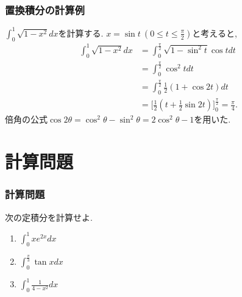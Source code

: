 \begin{frame}
\frametitle{置換積分の計算例}

$\int_0^1 \sqrt{1-x^2}dx$を計算する. 
$x=\sin t \ (0 \le t \le \frac{\pi}{2})$と考えると, 
\begin{align*}
\int_0^1 \sqrt{1-x^2}dx & = \int_0^\frac{\pi}{2} \sqrt{1-\sin^2 t} \cos t dt \\
& =  \int_0^\frac{\pi}{2} \cos^2 t dt \\
& =   \int_0^\frac{\pi}{2} \frac{1}{2}(1+\cos 2t)dt \\
& = \Big[\frac{1}{2}(t+\frac{1}{2} \sin 2t) \Big]_0^\frac{\pi}{2}=\frac{\pi}{4}. 
\end{align*}
倍角の公式$\cos 2 \theta = \cos^2 \theta-\sin^2 \theta=2 \cos^2 \theta-1$を用いた. 

\end{frame}


\section{計算問題}

\begin{frame}
\frametitle{計算問題}

\begin{Prob}
次の定積分を計算せよ. 
\begin{enumerate} 
\item $\int_0^1x e^{2x}dx$
\item $\int_{0}^\frac{\pi}{3} \tan xdx$
\item $\int_0^1\frac{1}{4-x^2}dx$
\end{enumerate}
\end{Prob}

\end{frame}




